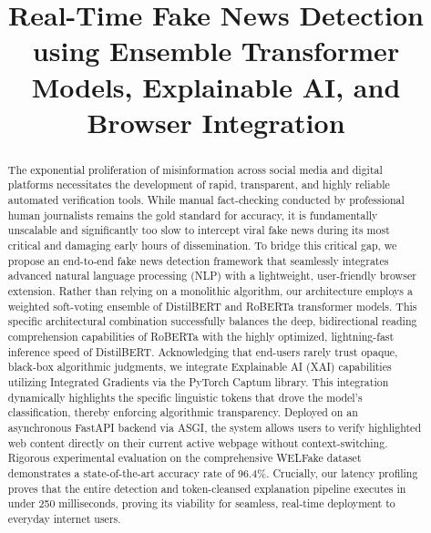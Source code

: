 \documentclass[conference]{IEEEtran}
\begin{document}
\title{Real-Time Fake News Detection using Ensemble Transformer Models, Explainable AI, and Browser Integration}


\maketitle

\begin{abstract}
The exponential proliferation of misinformation across social media and digital platforms necessitates the development of rapid, transparent, and highly reliable automated verification tools. While manual fact-checking conducted by professional human journalists remains the gold standard for accuracy, it is fundamentally unscalable and significantly too slow to intercept viral fake news during its most critical and damaging early hours of dissemination. To bridge this critical gap, we propose an end-to-end fake news detection framework that seamlessly integrates advanced natural language processing (NLP) with a lightweight, user-friendly browser extension. Rather than relying on a monolithic algorithm, our architecture employs a weighted soft-voting ensemble of DistilBERT and RoBERTa transformer models. This specific architectural combination successfully balances the deep, bidirectional reading comprehension capabilities of RoBERTa with the highly optimized, lightning-fast inference speed of DistilBERT. Acknowledging that end-users rarely trust opaque, black-box algorithmic judgments, we integrate Explainable AI (XAI) capabilities utilizing Integrated Gradients via the PyTorch Captum library. This integration dynamically highlights the specific linguistic tokens that drove the model's classification, thereby enforcing algorithmic transparency. Deployed on an asynchronous FastAPI backend via ASGI, the system allows users to verify highlighted web content directly on their current active webpage without context-switching. Rigorous experimental evaluation on the comprehensive WELFake dataset demonstrates a state-of-the-art accuracy rate of 96.4\%. Crucially, our latency profiling proves that the entire detection and token-cleansed explanation pipeline executes in under 250 milliseconds, proving its viability for seamless, real-time deployment to everyday internet users.
\end{abstract}
\end{document}
